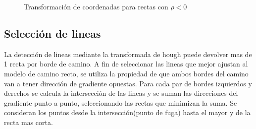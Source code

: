 \documentclass[a4paper,spanish]{article}
\begin{document}
\begin{figure}[H]

\caption{Transformación de coordenadas para rectas con $\rho < 0 $}
\label{fig:rho_negativo}
\end{figure}



\subsection{Selección de lineas}

	La detección de lineas mediante la transformada de hough puede devolver mas de 1 recta por borde de camino. A fin de seleccionar las lineas que mejor ajustan al modelo de  camino recto, se utiliza la propiedad de que ambos bordes del camino van a tener dirección de gradiente opuestas. 
	Para cada par de bordes izquierdos y derechos se calcula la intersección  de las lineas y se suman las direcciones del gradiente punto a punto, seleccionando las rectas que minimizan la suma. Se consideran los puntos desde la intersección(punto de fuga) hasta el mayor y de la recta mas corta.\\
    
\end{document}
